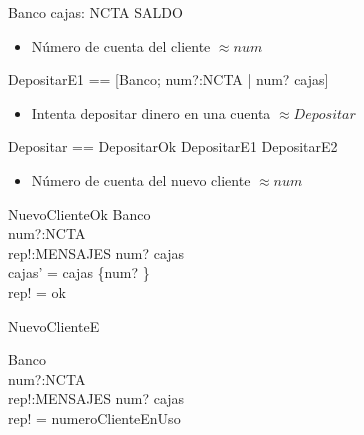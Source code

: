 \begin{schema}{Banco}
cajas: NCTA \pfun SALDO
\end{schema}

\begin{itemize}
  \item Número de cuenta del cliente $\approx num$ \\
\end{itemize}


\begin{zed}
DepositarE1 == [\Xi Banco; num?:NCTA | num? \notin \dom cajas]
\end{zed}


\begin{itemize}
  \item Intenta depositar dinero en una cuenta $\approx Depositar$ \\
\end{itemize}

\begin{zed}
Depositar == DepositarOk \lor DepositarE1 \lor DepositarE2
\end{zed}

\begin{itemize}
  \item Número de cuenta del nuevo cliente $\approx num$ \\
\end{itemize}

\begin{schema}{NuevoClienteOk}
\Delta Banco \\
num?:NCTA \\
rep!:MENSAJES
\where
num? \notin \dom cajas \\
cajas' = cajas \cup \{num? \} \\
rep! = ok
\end{schema}

\begin{schema}{NuevoClienteE}

\Xi Banco \\
num?:NCTA \\
rep!:MENSAJES
\where
num? \in \dom cajas \\
rep! = numeroClienteEnUso
\end{schema}

